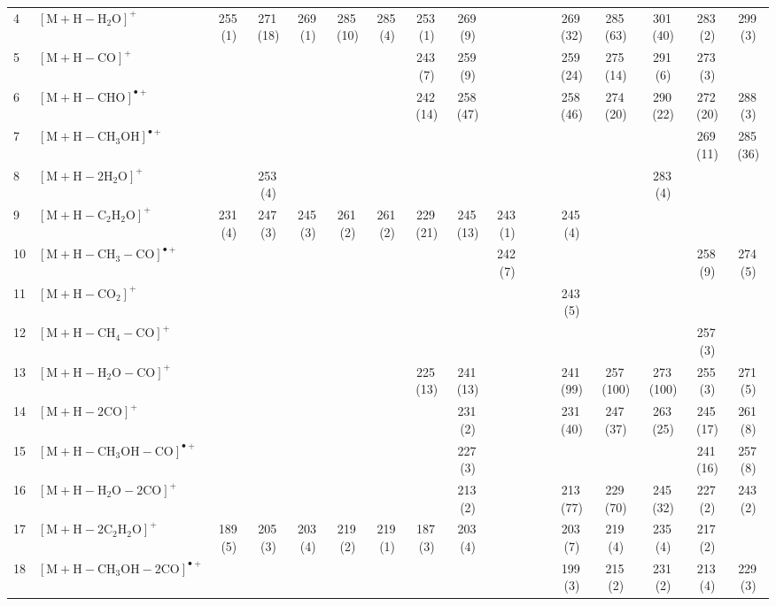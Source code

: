 \documentclass[]{article}
\begin{document}
\begin{table}
{\begin{tabular}{ll|ccccc|ccccc|ccccc}
  4 & $\mathrm{[M{+}H{-}H_{2}O]^+}$ & 255\,(1) & 271\,(18) & 269\,(1) & 285\,(10) & 285\,(4) & 253\,(1) & 269\,(9) &  &  &  & 269\,(32) & 285\,(63) & 301\,(40) & 283\,(2) & 299\,(3) \\ 
  5 & $\mathrm{[M{+}H{-}CO]^+}$ &  &  &  &  &  & 243\,(7) & 259\,(9) &  &  &  & 259\,(24) & 275\,(14) & 291\,(6) & 273\,(3) &  \\ 
  6 & $\mathrm{[M{+}H{-}CHO]^{\bullet+}}$ &  &  &  &  &  & 242\,(14) & 258\,(47) &  &  &  & 258\,(46) & 274\,(20) & 290\,(22) & 272\,(20) & 288\,(3) \\ 
  7 & $\mathrm{[M{+}H{-}CH_{3}OH]^{\bullet+}}$ &  &  &  &  &  &  &  &  &  &  &  &  &  & 269\,(11) & 285\,(36) \\ 
  8 & $\mathrm{[M{+}H{-}2H_{2}O]^+}$ &  & 253\,(4) &  &  &  &  &  &  &  &  &  &  & 283\,(4) &  &  \\ 
  9 & $\mathrm{[M{+}H{-}C_{2}H_{2}O]^+}$ & 231\,(4) & 247\,(3) & 245\,(3) & 261\,(2) & 261\,(2) & 229\,(21) & 245\,(13) & 243\,(1) &  &  & 245\,(4) &  &  &  &  \\ 
  10 & $\mathrm{[M{+}H{-}CH_{3}{-}CO]^{\bullet+}}$ &  &  &  &  &  &  &  & 242\,(7) &  &  &  &  &  & 258\,(9) & 274\,(5) \\ 
  11 & $\mathrm{[M{+}H{-}CO_{2}]^+}$ &  &  &  &  &  &  &  &  &  &  & 243\,(5) &  &  &  &  \\ 
  12 & $\mathrm{[M{+}H{-}CH_{4}{-}CO]^+}$ &  &  &  &  &  &  &  &  &  &  &  &  &  & 257\,(3) &  \\ 
  13 & $\mathrm{[M{+}H{-}H_{2}O{-}CO]^+}$ &  &  &  &  &  & 225\,(13) & 241\,(13) &  &  &  & 241\,(99) & 257\,(100) & 273\,(100) & 255\,(3) & 271\,(5) \\ 
  14 & $\mathrm{[M{+}H{-}2CO]^+}$ &  &  &  &  &  &  & 231\,(2) &  &  &  & 231\,(40) & 247\,(37) & 263\,(25) & 245\,(17) & 261\,(8) \\ 
  15 & $\mathrm{[M{+}H{-}CH_{3}OH{-}CO]^{\bullet+}}$ &  &  &  &  &  &  & 227\,(3) &  &  &  &  &  &  & 241\,(16) & 257\,(8) \\ 
  16 & $\mathrm{[M{+}H{-}H_{2}O{-}2CO]^+}$ &  &  &  &  &  &  & 213\,(2) &  &  &  & 213\,(77) & 229\,(70) & 245\,(32) & 227\,(2) & 243\,(2) \\ 
  17 & $\mathrm{[M{+}H{-}2C_{2}H_{2}O]^+}$ & 189\,(5) & 205\,(3) & 203\,(4) & 219\,(2) & 219\,(1) & 187\,(3) & 203\,(4) &  &  &  & 203\,(7) & 219\,(4) & 235\,(4) & 217\,(2) &  \\ 
  18 & $\mathrm{[M{+}H{-}CH_{3}OH{-}2CO]^{\bullet+}}$ &  &  &  &  &  &  &  &  &  &  & 199\,(3) & 215\,(2) & 231\,(2) & 213\,(4) & 229\,(3) \\ 

\end{tabular}}
\end{table}
\end{document}
